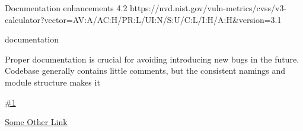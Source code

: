 \vuln
    { %
      Documentation enhancements
    }
    { %
      4.2
    }
    { %
      https://nvd.nist.gov/vuln-metrics/cvss/v3-calculator?vector=AV:A/AC:H/PR:L/UI:N/S:U/C:L/I:H/A:H&version=3.1
    }
    { %
    \item documentation
    }
    { %
    Proper documentation is crucial for avoiding introducing new bugs in the future.
Codebase generally contains little comments, but the consistent namings and module structure makes it 

    }
    { %
      
    }
    { %
    \item\href{github.com}{\#1}
    \item\href{github.com}{Some Other Link}
    }
